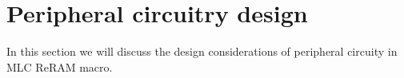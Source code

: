 \section{Peripheral circuitry design} \label{sec:peripheral}

In this section we will discuss the design considerations of peripheral circuity in MLC ReRAM macro.




